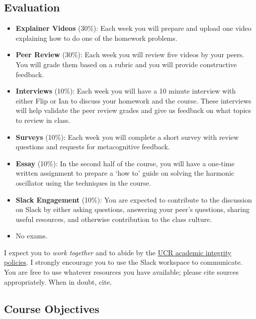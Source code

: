\documentclass[12pt]{article}
\numberwithin{equation}{section}    %
\begin{document}
\subsection*{Evaluation}
\begin{itemize}
\item \textbf{Explainer Videos} (30\%): Each week you will prepare and upload one video explaining how to do one of the homework problems. 

\item \textbf{Peer Review} (30\%): Each week you will review five videos by your peers. You will grade them based on a rubric and you will provide constructive feedback. 

\item \textbf{Interviews} (10\%): Each week you will have a 10 minute interview with either Flip or Ian to discuss your homework and the course. These interviews will help validate the peer review grades and give us feedback on what topics to review in class.

\item \textbf{Surveys} (10\%): Each week you will complete a short survey with review questions and requests for metacognitive feedback.

\item \textbf{Essay} (10\%): In the second half of the course, you will have a one-time written assignment to prepare a `how to' guide on solving the harmonic oscillator using the techniques in the course. 

\item \textbf{Slack Engagement} (10\%): You are expected to contribute to the discussion on Slack by either asking questions, answering your peer's questions, sharing useful resources, and otherwise contribution to the class culture.

\item No exams. 
\end{itemize}

I expect you to \emph{work together} and to abide by the \href{http://conduct.ucr.edu/policies/academicintegrity.html}{UCR academic integrity policies}. I strongly encourage you to use the Slack workspace to communicate. You are free to use whatever resources you have available; please cite sources appropriately. When in doubt, cite.

\subsection*{Course Objectives}
\end{document}
